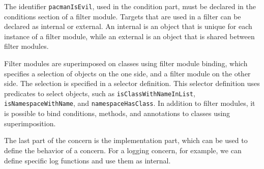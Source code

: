 The identifier \lstinline|pacmanIsEvil|, used in the condition part, must be declared in the conditions section of a filter module.
Targets that are used in a filter can be declared as internal or external.
An internal is an object that is unique for each instance of a filter module, while an external is an object that is shared between filter modules.

Filter modules are superimposed on classes using filter module binding, which specifies a selection of objects on the one side, and a filter module on the other side.
The selection is specified in a selector definition.
This selector definition uses predicates to select objects, such as \lstinline|isClassWithNameInList|, \hbox{\lstinline|isNamespaceWithName|}, and \lstinline|namespaceHasClass|.
In addition to filter modules, it is possible to bind conditions, methods, and annotations to classes using superimposition.

The last part of the concern is the implementation part, which can be used to define the behavior of a concern.
For a logging concern, for example, we can define specific log functions and use them as internal.

